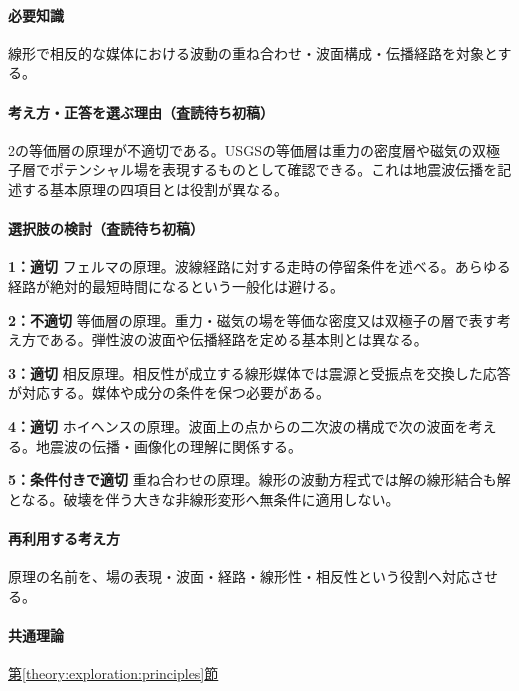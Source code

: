 \paragraph{必要知識} 線形で相反的な媒体における波動の重ね合わせ・波面構成・伝播経路を対象とする。

\paragraph{考え方・正答を選ぶ理由（査読待ち初稿）} 2の等価層の原理が不適切である。USGSの等価層は重力の密度層や磁気の双極子層でポテンシャル場を表現するものとして確認できる。これは地震波伝播を記述する基本原理の四項目とは役割が異なる。

\paragraph{選択肢の検討（査読待ち初稿）}\mbox{}\par

\noindent\textbf{1：適切} フェルマの原理。波線経路に対する走時の停留条件を述べる。あらゆる経路が絶対的最短時間になるという一般化は避ける。\par

\noindent\textbf{2：不適切} 等価層の原理。重力・磁気の場を等価な密度又は双極子の層で表す考え方である。弾性波の波面や伝播経路を定める基本則とは異なる。\par

\noindent\textbf{3：適切} 相反原理。相反性が成立する線形媒体では震源と受振点を交換した応答が対応する。媒体や成分の条件を保つ必要がある。\par

\noindent\textbf{4：適切} ホイヘンスの原理。波面上の点からの二次波の構成で次の波面を考える。地震波の伝播・画像化の理解に関係する。\par

\noindent\textbf{5：条件付きで適切} 重ね合わせの原理。線形の波動方程式では解の線形結合も解となる。破壊を伴う大きな非線形変形へ無条件に適用しない。\par

\paragraph{再利用する考え方} 原理の名前を、場の表現・波面・経路・線形性・相反性という役割へ対応させる。

\paragraph{共通理論} \hyperref[theory:exploration:principles]{第\ref*{theory:exploration:principles}節}

